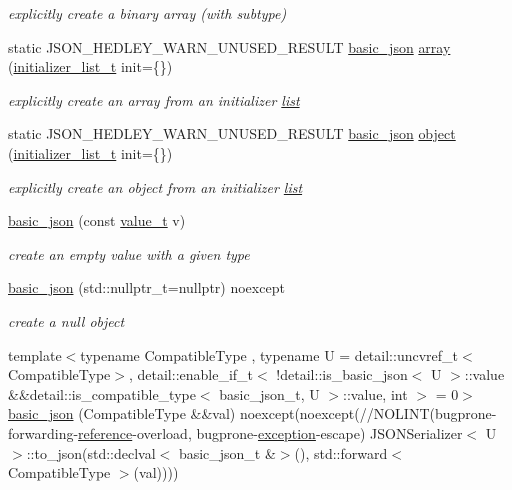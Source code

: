 \begin{DoxyCompactItemize}
\begin{DoxyCompactList}\small\item\em explicitly create a binary array (with subtype) \end{DoxyCompactList}\item 
static J\+S\+O\+N\+\_\+\+H\+E\+D\+L\+E\+Y\+\_\+\+W\+A\+R\+N\+\_\+\+U\+N\+U\+S\+E\+D\+\_\+\+R\+E\+S\+U\+LT \hyperlink{classnlohmann_1_1basic__json}{basic\+\_\+json} \hyperlink{classnlohmann_1_1basic__json_a2c8d8f5741aedadac8f3bffd8f2ce13e}{array} (\hyperlink{classnlohmann_1_1basic__json_ac569f292a070dfd2f6b69c16e746095a}{initializer\+\_\+list\+\_\+t} init=\{\})
\begin{DoxyCompactList}\small\item\em explicitly create an array from an initializer \hyperlink{protocollist-p}{list} \end{DoxyCompactList}\item 
static J\+S\+O\+N\+\_\+\+H\+E\+D\+L\+E\+Y\+\_\+\+W\+A\+R\+N\+\_\+\+U\+N\+U\+S\+E\+D\+\_\+\+R\+E\+S\+U\+LT \hyperlink{classnlohmann_1_1basic__json}{basic\+\_\+json} \hyperlink{classnlohmann_1_1basic__json_a9a4df356e05415438fadf8a15e583903}{object} (\hyperlink{classnlohmann_1_1basic__json_ac569f292a070dfd2f6b69c16e746095a}{initializer\+\_\+list\+\_\+t} init=\{\})
\begin{DoxyCompactList}\small\item\em explicitly create an object from an initializer \hyperlink{protocollist-p}{list} \end{DoxyCompactList}\item 
\hyperlink{classnlohmann_1_1basic__json_a19734fbc9c97d536832892ddacd6b62a}{basic\+\_\+json} (const \hyperlink{namespacenlohmann_1_1detail_a1ed8fc6239da25abcaf681d30ace4985}{value\+\_\+t} v)
\begin{DoxyCompactList}\small\item\em create an empty value with a given type \end{DoxyCompactList}\item 
\hyperlink{classnlohmann_1_1basic__json_ace6fbaf6c64f60b61922b5c9d3e61aa6}{basic\+\_\+json} (std\+::nullptr\+\_\+t=nullptr) noexcept
\begin{DoxyCompactList}\small\item\em create a null object \end{DoxyCompactList}\item 
{\footnotesize template$<$typename Compatible\+Type , typename U  = detail\+::uncvref\+\_\+t$<$\+Compatible\+Type$>$, detail\+::enable\+\_\+if\+\_\+t$<$ !detail\+::is\+\_\+basic\+\_\+json$<$ U $>$\+::value \&\&detail\+::is\+\_\+compatible\+\_\+type$<$ basic\+\_\+json\+\_\+t, U $>$\+::value, int $>$  = 0$>$ }\\\hyperlink{classnlohmann_1_1basic__json_a232bddcef573bde8777a6a87da0048dd}{basic\+\_\+json} (Compatible\+Type \&\&val) noexcept(noexcept(//N\+O\+L\+I\+NT(bugprone-\/forwarding-\/\hyperlink{classnlohmann_1_1basic__json_a220ae98554a76205fb7f8822d36b2d5a}{reference}-\/overload, bugprone-\/\hyperlink{classnlohmann_1_1detail_1_1exception}{exception}-\/escape) J\+S\+O\+N\+Serializer$<$ U $>$\+::to\+\_\+json(std\+::declval$<$ basic\+\_\+json\+\_\+t \&$>$(), std\+::forward$<$ Compatible\+Type $>$(val))))

\end{DoxyCompactItemize}
